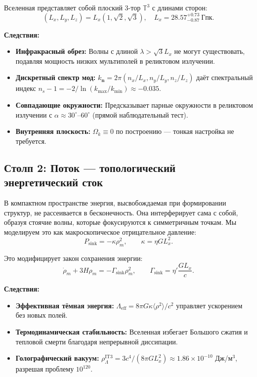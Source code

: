 \documentclass[12pt,a4paper]{article}
\begin{document}
Вселенная представляет собой плоский 3-тор $\mathbb{T}^3$ с длинами сторон:
\begin{equation}
(L_x, L_y, L_z) = L_x \left(1, \sqrt{2}, \sqrt{3}\right), \quad L_x = 28.57^{+0.73}_{-0.87}~\mathrm{Гпк}.
\end{equation}

\textbf{Следствия:}
\begin{itemize}
    \item \textbf{Инфракрасный обрез:} Волны с длиной $\lambda > \sqrt{3}L_x$ не могут существовать, подавляя мощность низких мультиполей в реликтовом излучении.
    \item \textbf{Дискретный спектр мод:} $k_{\mathbf{n}} = 2\pi(n_x/L_x, n_y/L_y, n_z/L_z)$ даёт спектральный индекс $n_s - 1 = -2/\ln(k_{\max}/k_{\min}) \approx -0.035$.
    \item \textbf{Совпадающие окружности:} Предсказывает парные окружности в реликтовом излучении с $\alpha \approx 30^\circ\text{--}60^\circ$ (прямой наблюдательный тест).
    \item \textbf{Внутренняя плоскость:} $\Omega_k \equiv 0$ по построению — тонкая настройка не требуется.
\end{itemize}

\subsection{Столп 2: Поток — топологический энергетический сток}

В компактном пространстве энергия, высвобождаемая при формировании структур, не рассеивается в бесконечность. Она интерферирует сама с собой, образуя стоячие волны, которые фокусируются к симметричным точкам. Мы моделируем это как макроскопическое отрицательное давление:
\begin{equation}
P_{\mathrm{sink}} = -\kappa \rho_m^2, \qquad \kappa = \eta G L_x^2.
\end{equation}

Это модифицирует закон сохранения энергии:
\begin{equation}
\dot{\rho}_m + 3H\rho_m = -\Gamma_{\mathrm{sink}}\rho_m^2, \qquad \Gamma_{\mathrm{sink}} = \eta' \frac{G L_x}{c}.
\end{equation}

\textbf{Следствия:}
\begin{itemize}
    \item \textbf{Эффективная тёмная энергия:} $\Lambda_{\mathrm{eff}} = 8\pi G \kappa \langle \rho^2 \rangle/c^2$ управляет ускорением без новых полей.
    \item \textbf{Термодинамическая стабильность:} Вселенная избегает Большого сжатия и тепловой смерти благодаря непрерывной диссипации.
    \item \textbf{Голографический вакуум:} $\rho_\Lambda^{\mathrm{IT3}} = 3c^4/(8\pi G L_x^2) \approx 1.86 \times 10^{-10}$ Дж/м$^3$, разрешая проблему $10^{120}$.
\end{itemize}
\end{document}

